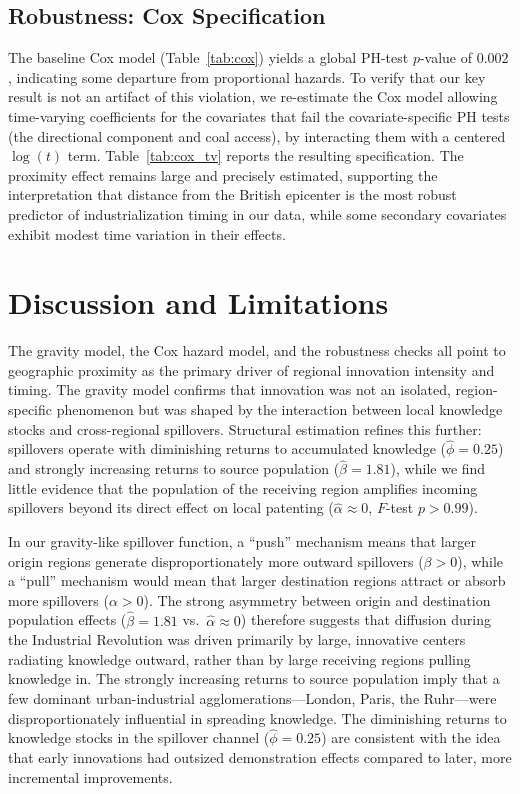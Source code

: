 \documentclass[letterpaper,12pt,leqno]{article}
\begin{document}
\subsection{Robustness: Cox Specification}
\label{sec:cox_robust}

The baseline Cox model (Table~\ref{tab:cox}) yields a global PH-test \(p\)-value of \(0.002\), indicating some departure from proportional hazards. To verify that our key result is not an artifact of this violation, we re-estimate the Cox model allowing time-varying coefficients for the covariates that fail the covariate-specific PH tests (the directional component and coal access), by interacting them with a centered \(\log(t)\) term. Table~\ref{tab:cox_tv} reports the resulting specification. The proximity effect remains large and precisely estimated, supporting the interpretation that distance from the British epicenter is the most robust predictor of industrialization timing in our data, while some secondary covariates exhibit modest time variation in their effects.



\section{Discussion and Limitations}

The gravity model, the Cox hazard model, and the robustness checks all point to geographic proximity as the primary driver of regional innovation intensity and timing. The gravity model confirms that innovation was not an isolated, region-specific phenomenon but was shaped by the interaction between local knowledge stocks and cross-regional spillovers. Structural estimation refines this further: spillovers operate with diminishing returns to accumulated knowledge (\(\hat{\phi} = 0.25\)) and strongly increasing returns to source population (\(\hat{\beta} = 1.81\)), while we find little evidence that the population of the receiving region amplifies incoming spillovers beyond its direct effect on local patenting (\(\hat{\alpha} \approx 0\), \(F\)-test \(p > 0.99\)).

In our gravity-like spillover function, a ``push'' mechanism means that larger origin regions generate disproportionately more outward spillovers (\(\beta > 0\)), while a ``pull'' mechanism would mean that larger destination regions attract or absorb more spillovers (\(\alpha > 0\)). The strong asymmetry between origin and destination population effects (\(\hat{\beta} = 1.81\) vs.\ \(\hat{\alpha} \approx 0\)) therefore suggests that diffusion during the Industrial Revolution was driven primarily by large, innovative centers radiating knowledge outward, rather than by large receiving regions pulling knowledge in. The strongly increasing returns to source population imply that a few dominant urban-industrial agglomerations---London, Paris, the Ruhr---were disproportionately influential in spreading knowledge. The diminishing returns to knowledge stocks in the spillover channel (\(\hat{\phi} = 0.25\)) are consistent with the idea that early innovations had outsized demonstration effects compared to later, more incremental improvements.
\end{document}
